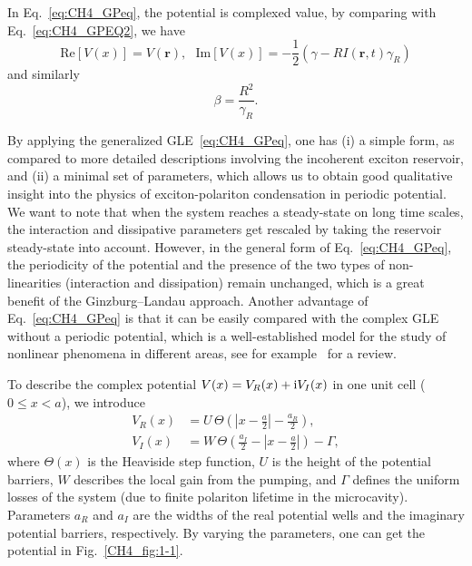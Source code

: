 In Eq.~\eqref{eq:CH4_GPeq}, the potential is complexed value, by comparing with Eq.~\eqref{eq:CH4_GPEQ2}, we have
\begin{equation}
    \textrm{Re}\left[ V\left(x\right)\right] = V\left(\mathbf{r}\right),~ ~ ~ \textrm{Im}\left[V\left(x\right)\right]= -\frac{1}{2}\left( \gamma - RI\left(\mathbf{r},t\right)\gamma_R \right)
\end{equation}
and similarly
\begin{equation}
    \beta = \frac{R^2}{\gamma_R}.
\end{equation}


By applying the generalized GLE~\eqref{eq:CH4_GPeq}, one has (i) a simple form, as compared to more detailed descriptions involving the incoherent exciton reservoir, and (ii) a minimal set of parameters, which allows us to obtain good qualitative insight into the physics of exciton-polariton condensation in periodic potential.
We want to note that when the system reaches a steady-state on long time scales, the interaction and dissipative parameters get rescaled by taking the reservoir steady-state into account.
However, in the general form of Eq.~\eqref{eq:CH4_GPeq}, the periodicity of the potential and the presence of the two types of non-linearities (interaction and dissipation) remain unchanged, which is a great benefit of the Ginzburg--Landau approach.
Another advantage of Eq.~\eqref{eq:CH4_GPeq} is that it can be easily compared with the complex GLE without a periodic potential, which is a well-established model for the study of nonlinear phenomena in different areas, see for example~\cite{Aranson:2002aa} for a review.

To describe the complex potential $V(x)=V_R(x)+{\mathrm{i}}V_I(x)$ in one unit cell ($0\le x <a$), we introduce
%
\begin{subequations}\label{eq:CH4_CoxV}
\begin{align}
  V_R(x) &= U\,\Theta\!\left(\left | x -\frac{a}{2} \right |-\frac{a_R}{2} \right), \\
  V_I(x) &= W\,\Theta\!\left(\frac{a_I}{2}-\left | x -\frac{a}{2} \right | \right)-\Gamma,
\end{align}
\end{subequations}
%
where $\Theta(x)$ is the Heaviside step function, $U$ is the height of the potential barriers, $W$ describes the local gain from the pumping, and $\Gamma$ defines the uniform losses of the system (due to finite polariton lifetime in the microcavity).
Parameters $a_R$ and $a_I$ are the widths of the real potential wells and the imaginary potential barriers, respectively.
By varying the parameters, one can get the potential in Fig.~\ref{CH4_fig:1-1}.

